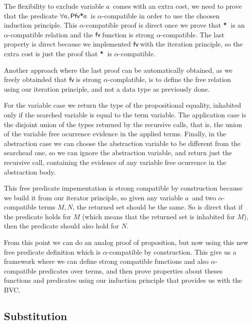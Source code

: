 \documentclass{entcs}
\newcommand{\alp}{\ensuremath{\alpha}}
\newcommand{\fv}{\ensuremath{{\AgdaFunction{fv}}\,}}
\newcommand{\free}{\ensuremath{\mathbin{\AgdaFunction{*}}}}
\begin{document}
The flexibility to exclude variable $a$\  comes with an extra cost, we need to prove that the predicate $\forall a , \AgdaFunction{Pfv*} a$\ is \alp-compatible in order to use the choosen induction principle. This \alp-compatible proof is direct once we prove that \free\ is an \alp-compatible relation and the \fv function is strong \alp-compatible. The last property is direct because we implemented \fv with the iteration principle, so the extra cost is just the proof that \free\ is \alp-compatible.

Another approach where the last proof can be automatically obtained, as we freely obtainded that \fv is strong \alp-complatible, is to define the free relation using our iteration principle, and not a data type as previously done.

 \hspace{5px}

For the variable case we return the type of the propositional equality, inhabited only if the searched variable is equal to the term variable. The application case is the disjoint union of the types returned by the recursive calls, that is, the union of the variable free ocurrence evidence in the applied terms. Finally, in the abstraction case we can choose the abstraction variable to be different from the searchead one, so we can ignore the abstraction variable, and return just the recursive call, containing the evidence of any variable free ocurrence in the abstraction body. 

This free predicate impementation is strong compatible by construction because we build it from our iterator principle, so given any variable $a$\ and two \alp-compatible terms $M,N$, the returned set should be the same. So is direct that if the predicate holds for $M$ (which means that the returned set is inhabited for $M$), then the predicate should also hold for $N$. 

From this point we can  do an analog proof of  proposition, but now using this new free predicate definition which is \alp-compatible by construction. This give us a framework where we can define strong compatible functions and also \alp-compatible predicates over terms, and then prove properties about theses functions and predicates using our induction principle that provides us with the BVC.

\subsection{Substitution}
\label{subst}
\end{document}
